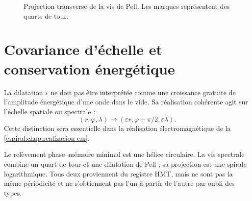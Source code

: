\begin{figure}[htbp]
\centering
{}
\caption{Projection transverse de la vis de Pell. Les marques représentent des quarts de tour.}
\label{espiral:fig:tornillo-pell}
\end{figure}

\section{Covariance d'échelle et conservation énergétique}

La dilatation \(\varepsilon\) ne doit pas être interprétée comme une croissance gratuite de l'amplitude énergétique d'une onde dans le vide. Sa réalisation cohérente agit sur l'échelle spatiale ou spectrale :
\[
 (r,\varphi,\lambda)
 \longmapsto
 (\varepsilon r,\varphi+\pi/2,\varepsilon\lambda).
\]
Cette distinction sera essentielle dans la réalisation électromagnétique de la \cref{espiral:chap:realizacion-em}.

\begin{resultbox}[title={Compatibilité exacte entre la vis spectrale de Pell et la suspension phase--mémoire}]
Le relèvement phase--mémoire minimal est une hélice circulaire. La vis spectrale combine un quart de tour et une dilatation de Pell ; sa projection est une spirale logarithmique. Tous deux proviennent du registre HMT, mais ne sont pas la même périodicité et ne s'obtiennent pas l'un à partir de l'autre par oubli des types.
\end{resultbox}

